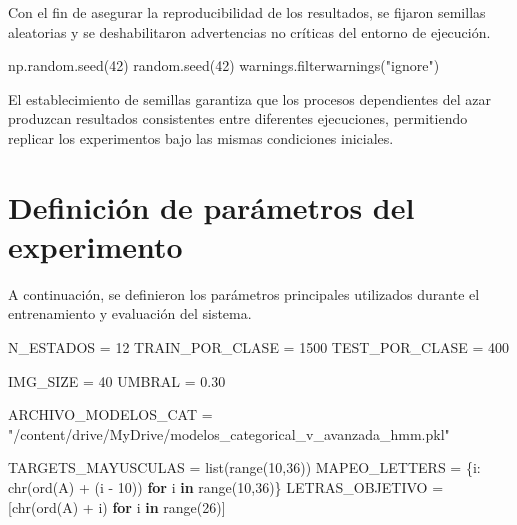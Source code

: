 \documentclass[
  spanish,
  us-letterpaper,
  DIV=11,
  numbers=noendperiod]{scrreprt}
\newenvironment{Shaded}{\begin{snugshade}}{\end{snugshade}}
\newcommand{\BuiltInTok}[1]{\textcolor[rgb]{0.00,0.23,0.31}{#1}}
\newcommand{\CommentTok}[1]{\textcolor[rgb]{0.37,0.37,0.37}{#1}}
\newcommand{\ControlFlowTok}[1]{\textcolor[rgb]{0.00,0.23,0.31}{\textbf{#1}}}
\newcommand{\DecValTok}[1]{\textcolor[rgb]{0.68,0.00,0.00}{#1}}
\newcommand{\FloatTok}[1]{\textcolor[rgb]{0.68,0.00,0.00}{#1}}
\newcommand{\KeywordTok}[1]{\textcolor[rgb]{0.00,0.23,0.31}{\textbf{#1}}}
\newcommand{\NormalTok}[1]{\textcolor[rgb]{0.00,0.23,0.31}{#1}}
\newcommand{\OperatorTok}[1]{\textcolor[rgb]{0.37,0.37,0.37}{#1}}
\newcommand{\StringTok}[1]{\textcolor[rgb]{0.13,0.47,0.30}{#1}}
\begin{document}
Con el fin de asegurar la reproducibilidad de los resultados, se fijaron
semillas aleatorias y se deshabilitaron advertencias no críticas del
entorno de ejecución.

\begin{Shaded}
\begin{Highlighting}[]
\NormalTok{np.random.seed(}\DecValTok{42}\NormalTok{) }
\NormalTok{random.seed(}\DecValTok{42}\NormalTok{) }
\NormalTok{warnings.filterwarnings(}\StringTok{"ignore"}\NormalTok{) }
\end{Highlighting}
\end{Shaded}

El establecimiento de semillas garantiza que los procesos dependientes
del azar produzcan resultados consistentes entre diferentes ejecuciones,
permitiendo replicar los experimentos bajo las mismas condiciones
iniciales.

\section{Definición de parámetros del
experimento}\label{definiciuxf3n-de-paruxe1metros-del-experimento}

A continuación, se definieron los parámetros principales utilizados
durante el entrenamiento y evaluación del sistema.

\begin{Shaded}
\begin{Highlighting}[]
\NormalTok{N\_ESTADOS }\OperatorTok{=} \DecValTok{12}
\NormalTok{TRAIN\_POR\_CLASE }\OperatorTok{=} \DecValTok{1500}
\NormalTok{TEST\_POR\_CLASE }\OperatorTok{=} \DecValTok{400}

\NormalTok{IMG\_SIZE }\OperatorTok{=} \DecValTok{40}
\NormalTok{UMBRAL }\OperatorTok{=} \FloatTok{0.30}

\NormalTok{ARCHIVO\_MODELOS\_CAT }\OperatorTok{=} 
    \CommentTok{"/content/drive/MyDrive/modelos\_categorical\_v\_avanzada\_hmm.pkl"}

\NormalTok{TARGETS\_MAYUSCULAS }\OperatorTok{=} \BuiltInTok{list}\NormalTok{(}\BuiltInTok{range}\NormalTok{(}\DecValTok{10}\NormalTok{,}\DecValTok{36}\NormalTok{))}
\NormalTok{MAPEO\_LETTERS }\OperatorTok{=}\NormalTok{ \{i: }\BuiltInTok{chr}\NormalTok{(}\BuiltInTok{ord}\NormalTok{(}\StringTok{\textquotesingle{}A\textquotesingle{}}\NormalTok{) }\OperatorTok{+}\NormalTok{ (i }\OperatorTok{{-}} \DecValTok{10}\NormalTok{)) }\ControlFlowTok{for}\NormalTok{ i }\KeywordTok{in} \BuiltInTok{range}\NormalTok{(}\DecValTok{10}\NormalTok{,}\DecValTok{36}\NormalTok{)\}}
\NormalTok{LETRAS\_OBJETIVO }\OperatorTok{=}\NormalTok{ [}\BuiltInTok{chr}\NormalTok{(}\BuiltInTok{ord}\NormalTok{(}\StringTok{\textquotesingle{}A\textquotesingle{}}\NormalTok{) }\OperatorTok{+}\NormalTok{ i) }\ControlFlowTok{for}\NormalTok{ i }\KeywordTok{in} \BuiltInTok{range}\NormalTok{(}\DecValTok{26}\NormalTok{)]}
\end{Highlighting}
\end{Shaded}
\end{document}

